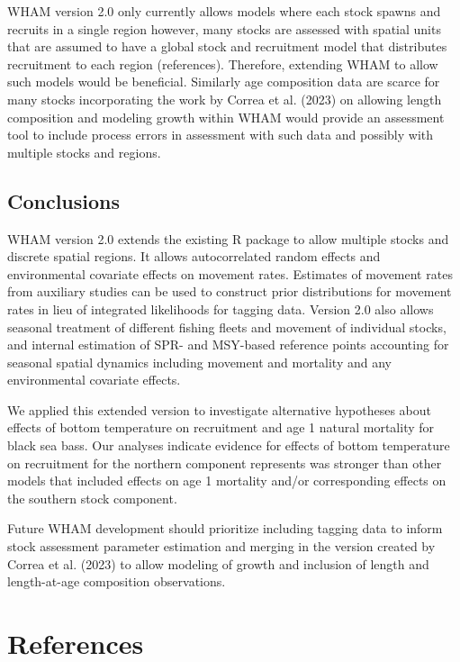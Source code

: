 \documentclass[
]{article}
\begin{document}
WHAM version 2.0 only currently allows models where each stock spawns
and recruits in a single region however, many stocks are assessed with
spatial units that are assumed to have a global stock and recruitment
model that distributes recruitment to each region (references).
Therefore, extending WHAM to allow such models would be beneficial.
Similarly age composition data are scarce for many stocks incorporating
the work by Correa et al. (2023) on allowing length composition and
modeling growth within WHAM would provide an assessment tool to include
process errors in assessment with such data and possibly with multiple
stocks and regions.

\hypertarget{conclusions}{%
\subsection*{Conclusions}\label{conclusions}}

WHAM version 2.0 extends the existing R package to allow multiple stocks
and discrete spatial regions. It allows autocorrelated random effects
and environmental covariate effects on movement rates. Estimates of
movement rates from auxiliary studies can be used to construct prior
distributions for movement rates in lieu of integrated likelihoods for
tagging data. Version 2.0 also allows seasonal treatment of different
fishing fleets and movement of individual stocks, and internal
estimation of SPR- and MSY-based reference points accounting for
seasonal spatial dynamics including movement and mortality and any
environmental covariate effects.

We applied this extended version to investigate alternative hypotheses
about effects of bottom temperature on recruitment and age 1 natural
mortality for black sea bass. Our analyses indicate evidence for effects
of bottom temperature on recruitment for the northern component
represents was stronger than other models that included effects on age 1
mortality and/or corresponding effects on the southern stock component.

Future WHAM development should prioritize including tagging data to
inform stock assessment parameter estimation and merging in the version
created by Correa et al. (2023) to allow modeling of growth and
inclusion of length and length-at-age composition observations.

\hypertarget{references}{%
\section*{References}\label{references}}
\end{document}
